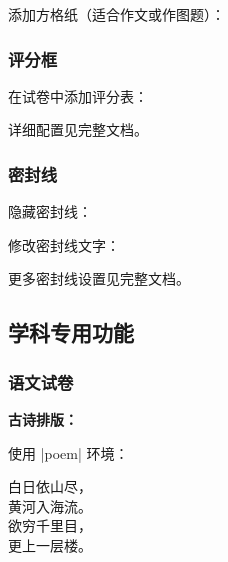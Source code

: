 添加方格纸（适合作文或作图题）：

\begin{latexcode}
  \squarepaper[
    rows = 20,     %
    columns = 20   %
  ]
\end{latexcode}

\subsubsection{评分框}

在试卷中添加评分表：

\begin{latexcode}
  \scorebox
\end{latexcode}

详细配置见完整文档。

\subsubsection{密封线}

隐藏密封线：

\begin{latexcode}
\end{latexcode}

修改密封线文字：

\begin{latexcode}
\end{latexcode}

更多密封线设置见完整文档。


\subsection{学科专用功能}

\subsubsection{语文试卷}

\textbf{古诗排版：}

使用 |poem| 环境：

\begin{latexcode}
  \begin{poem}
    白日依山尽，\\
    黄河入海流。\\
    欲穷千里目，\\
    更上一层楼。
  \end{poem}
\end{latexcode}

